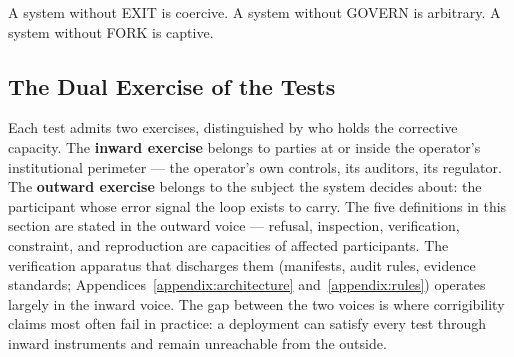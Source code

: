 \documentclass{article}
\begin{document}
A system without EXIT is coercive. A system without GOVERN is arbitrary. A system without FORK is captive.

\subsection{The Dual Exercise of the Tests}
\label{subsec:dual-exercise}

Each test admits two exercises, distinguished by who holds the corrective capacity. The \textbf{inward exercise} belongs to parties at or inside the operator's institutional perimeter --- the operator's own controls, its auditors, its regulator. The \textbf{outward exercise} belongs to the subject the system decides about: the participant whose error signal the loop exists to carry. The five definitions in this section are stated in the outward voice --- refusal, inspection, verification, constraint, and reproduction are capacities of affected participants. The verification apparatus that discharges them (manifests, audit rules, evidence standards; Appendices~\ref{appendix:architecture} and~\ref{appendix:rules}) operates largely in the inward voice. The gap between the two voices is where corrigibility claims most often fail in practice: a deployment can satisfy every test through inward instruments and remain unreachable from the outside.
\end{document}

